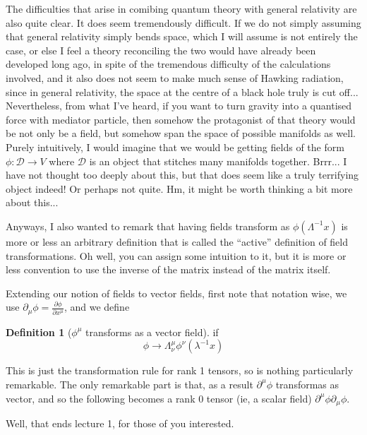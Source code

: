 \documentclass{report}
\theoremstyle{definition}
\newtheorem{definition}{Definition}
\begin{document}
The difficulties that arise in comibing quantum theory with general relativity
are also quite clear. It does seem tremendously difficult. If we do not simply
assuming that general relativity simply bends space, which I will assume is not
entirely the case, or else I feel a theory reconciling the two would have
already been developed long ago, in spite of the tremendous difficulty of the
calculations involved, and it also does not seem to make much sense of Hawking
radiation, since in general relativity, the space at the centre of a black hole
truly is cut off... Nevertheless, from what I've heard, if you want to turn
gravity into a quantised force with mediator particle, then somehow the
protagonist of that theory would be not only be a field, but somehow span the
space of possible manifolds as well. Purely intuitively, I would imagine that we
would be getting fields of the form $\phi : \mathcal{D} \to V$ where
$\mathcal{D}$ is an object that stitches many manifolds together. Brrr... I have
not thought too deeply about this, but that does seem like a truly terrifying
object indeed! Or perhaps not quite. Hm, it might be worth thinking a bit more
about this...

Anyways, I also wanted to remark that having fields transform as
$\phi(\Lambda^{-1}x)$ is more or less an arbitrary definition that is called the
``active'' definition of field transformations. Oh well, you can assign some
intuition to it, but it is more or less convention to use the inverse of the
matrix instead of the matrix itself.

Extending our notion of fields to vector fields, first note that notation wise,
we use $\partial_\mu \phi = \frac{\partial \phi}{\partial x^\mu}$, and we define

\begin{definition}[$\phi^\mu$ transforms as a vector field]
  if
  $$ \phi \to \Lambda^\mu_\nu \phi^\nu (\lambda^{-1} x) $$
\end{definition}

This is just the transformation rule for rank 1 tensors, so is nothing
particularly remarkable. The only remarkable part is that, as a result
$\partial^\mu \phi$ transformas as vector, and so the following becomes a rank 0
tensor (ie, a scalar field) $\partial^\mu \phi \partial_\mu \phi$.

Well, that ends lecture 1, for those of you interested. 
\end{document}
